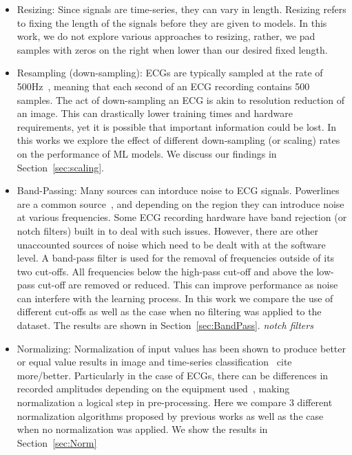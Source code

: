 \documentclass[pmlr,twocolumn]{jmlr}%
\begin{document}
\begin{itemize}
    \item Resizing: Since signals are time-series, they can vary in length. Resizing refers to fixing the length of the signals before they are given to models. In this work, we do not explore various approaches to resizing, rather, we pad samples with zeros on the right when lower than our desired fixed length. 
    \item Resampling (down-sampling): ECGs are typically sampled at the rate of 500Hz~\cite{luo2010review,uwaechia2021comprehensive}, meaning that each second of an ECG recording contains 500 samples. The act of down-sampling an ECG is akin to resolution reduction of an image. This can drastically lower training times and hardware requirements, yet it is possible that important information could be lost. In this works we explore the effect of different down-sampling (or scaling) rates on the performance of ML models. We discuss our findings in Section~\ref{sec:scaling}. 
    \item Band-Passing: Many sources can intorduce noise to ECG signals. Powerlines are a common source~\cite{uwaechia2021comprehensive}, and depending on the region they can introduce noise at various frequencies. Some ECG recording hardware have band rejection (or notch filters) built in to deal with such issues. However, there are other unaccounted sources of noise which need to be dealt with at the software level. A band-pass filter is used for the removal of frequencies outside of its two cut-offs. All frequencies below the high-pass cut-off and above the low-pass cut-off are removed or reduced. This can improve performance as noise can interfere with the learning process. In this work we compare the use of different cut-offs as well as the case when no filtering was applied to the dataset. The results are shown in Section~\ref{sec:BandPass}. \textit{notch filters}
    \item Normalizing: Normalization of input values has been shown to produce better or equal value results in image and time-series classification~\cite{bhanja2018impact}{\color{red} cite more/better}. Particularly in the case of ECGs, there can be differences in recorded amplitudes depending on the equipment used~\cite{uwaechia2021comprehensive}, making normalization a logical step in pre-processing. Here we compare 3 different normalization algorithms proposed by previous works as well as the case when no normalization was applied. We show the results in Section~\ref{sec:Norm}
\end{itemize}
\end{document}
